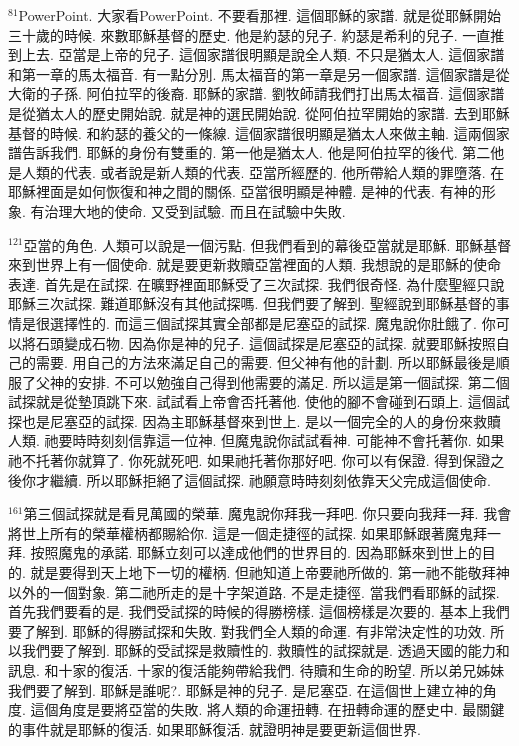 \documentclass{book}
\begin{document}
$^{81}$PowerPoint.
大家看PowerPoint.
不要看那裡.
這個耶穌的家譜.
就是從耶穌開始三十歲的時候.
來數耶穌基督的歷史.
他是約瑟的兒子.
約瑟是希利的兒子.
一直推到上去.
亞當是上帝的兒子.
這個家譜很明顯是說全人類.
不只是猶太人.
這個家譜和第一章的馬太福音.
有一點分別.
馬太福音的第一章是另一個家譜.
這個家譜是從大衛的子孫.
阿伯拉罕的後裔.
耶穌的家譜.
劉牧師請我們打出馬太福音.
這個家譜是從猶太人的歷史開始說.
就是神的選民開始說.
從阿伯拉罕開始的家譜.
去到耶穌基督的時候.
和約瑟的養父的一條線.
這個家譜很明顯是猶太人來做主軸.
這兩個家譜告訴我們.
耶穌的身份有雙重的.
第一他是猶太人.
他是阿伯拉罕的後代.
第二他是人類的代表.
或者說是新人類的代表.
亞當所經歷的.
他所帶給人類的罪墮落.
在耶穌裡面是如何恢復和神之間的關係.
亞當很明顯是神體.
是神的代表.
有神的形象.
有治理大地的使命.
又受到試驗.
而且在試驗中失敗.

$^{121}$亞當的角色.
人類可以說是一個污點.
但我們看到的幕後亞當就是耶穌.
耶穌基督來到世界上有一個使命.
就是要更新救贖亞當裡面的人類.
我想說的是耶穌的使命表達.
首先是在試探.
在曠野裡面耶穌受了三次試探.
我們很奇怪.
為什麼聖經只說耶穌三次試探.
難道耶穌沒有其他試探嗎.
但我們要了解到.
聖經說到耶穌基督的事情是很選擇性的.
而這三個試探其實全部都是尼塞亞的試探.
魔鬼說你肚餓了.
你可以將石頭變成石物.
因為你是神的兒子.
這個試探是尼塞亞的試探.
就要耶穌按照自己的需要.
用自己的方法來滿足自己的需要.
但父神有他的計劃.
所以耶穌最後是順服了父神的安排.
不可以勉強自己得到他需要的滿足.
所以這是第一個試探.
第二個試探就是從墊頂跳下來.
試試看上帝會否托著他.
使他的腳不會碰到石頭上.
這個試探也是尼塞亞的試探.
因為主耶穌基督來到世上.
是以一個完全的人的身份來救贖人類.
祂要時時刻刻信靠這一位神.
但魔鬼說你試試看神.
可能神不會托著你.
如果祂不托著你就算了.
你死就死吧.
如果祂托著你那好吧.
你可以有保證.
得到保證之後你才繼續.
所以耶穌拒絕了這個試探.
祂願意時時刻刻依靠天父完成這個使命.

$^{161}$第三個試探就是看見萬國的榮華.
魔鬼說你拜我一拜吧.
你只要向我拜一拜.
我會將世上所有的榮華權柄都賜給你.
這是一個走捷徑的試探.
如果耶穌跟著魔鬼拜一拜.
按照魔鬼的承諾.
耶穌立刻可以達成他們的世界目的.
因為耶穌來到世上的目的.
就是要得到天上地下一切的權柄.
但祂知道上帝要祂所做的.
第一祂不能敬拜神以外的一個對象.
第二祂所走的是十字架道路.
不是走捷徑.
當我們看耶穌的試探.
首先我們要看的是.
我們受試探的時候的得勝榜樣.
這個榜樣是次要的.
基本上我們要了解到.
耶穌的得勝試探和失敗.
對我們全人類的命運.
有非常決定性的功效.
所以我們要了解到.
耶穌的受試探是救贖性的.
救贖性的試探就是.
透過天國的能力和訊息.
和十家的復活.
十家的復活能夠帶給我們.
待贖和生命的盼望.
所以弟兄姊妹我們要了解到.
耶穌是誰呢?.
耶穌是神的兒子.
是尼塞亞.
在這個世上建立神的角度.
這個角度是要將亞當的失敗.
將人類的命運扭轉.
在扭轉命運的歷史中.
最關鍵的事件就是耶穌的復活.
如果耶穌復活.
就證明神是要更新這個世界.
\end{document}

